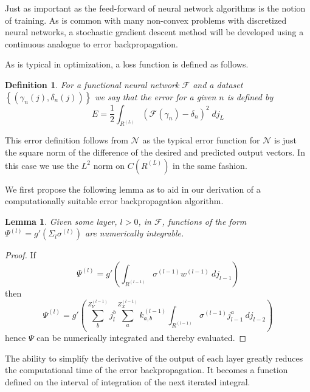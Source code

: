 \documentclass[titlepage, twoside]{article}
\numberwithin{equation}{subsection}
\newtheorem{lemma}[theorem]{Lemma}
\newtheorem{definition}[theorem]{Definition}
\numberwithin{theorem}{subsection}
\begin{document}
Just as important as the feed-forward of neural network algorithms is the notion of training. As is common with many non-convex problems with discretized neural networks, a stochastic gradient descent method will be developed using a continuous analogue to error backpropagation. 

As is typical in optimization, a loss function is defined as follows. 
\begin{definition}
    For a functional neural network $\mathcal{F}$ and a dataset $\left\{(\gamma_n(j), \delta_n(j))\right\}$ we say that the error for a given $n$ is defined by
    \begin{equation} \label{eq:error}
        E = \frac12 \int_{R^{(L)}}\left(\mathcal{F}(\gamma_n) - \delta_n \right)^2\;dj_L
    \end{equation}
\end{definition}
This error definition follows from $\mathcal{N}$ as the typical error function for $\mathcal{N}$ is just the square norm of the difference of the desired and predicted output vectors. In this case we use the $L^2$ norm on $C(R^{(L)})$ in the same fashion.

We first propose the following lemma as to aid in our derivation of a computationally suitable error backpropagation algorithm.


\begin{lemma}
Given some layer, $l>0$, in $\mathcal{F}$, functions of the form $\Psi^{(l)} =g'\left(\Sigma_l\sigma^{(l)}\right)$ are numerically integrable. 
\end{lemma}

\begin{proof}
If\begin{equation}\Psi^{(l)}=g'\left(\int_{R^{(l-1)}}{\sigma^{(l-1)} w^{(l-1)}\ dj_{l-1}}\right)\end{equation}
then
\begin{equation}
\Psi^{(l)}=
 g'\left(
   \sum_b^{Z^{(l-1)}_Y} j_{l}^{b}
   \sum_{a}^{Z^{(l-1)}_X} k_{a,b}^{(l-1)}
    \int_{R^{(l-1)}}{\sigma^{(l-1)} j_{l-1}^a \ dj_{l-2}}
  \right)
\end{equation}
hence $\Psi$ can be numerically integrated and thereby evaluated.
\end{proof}

The ability to simplify the derivative of the output of each layer greatly reduces the computational time of the error backpropagation. It becomes a function defined on the interval of integration of the next iterated integral.
\end{document}
